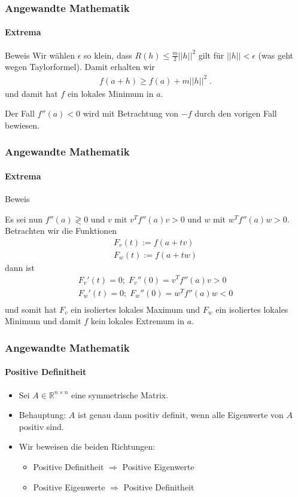 \documentclass{beamer}
\begin{document}
\begin{frame}
    \frametitle{Angewandte Mathematik}
\framesubtitle{Extrema}
    \begin{block}{Beweis}
Wir wählen $\epsilon$ so klein, dass $R(h) \leq \frac{m}{2}  ||h||^2$ gilt für $||h|| < \epsilon$  (was geht wegen Taylorformel).
Damit erhalten wir
\begin{align*}
f(a + h) \geq f(a) +  m ||h||^2 \;.
\end{align*}
und damit hat $f$ ein lokales Minimum in $a$.

Der Fall $f''(a) < 0$ wird mit Betrachtung von $-f$ durch den vorigen Fall bewiesen.
\end{block}
 \end{frame}



\begin{frame}
    \frametitle{Angewandte Mathematik}
\framesubtitle{Extrema}
    \begin{block}{Beweis}


Es sei nun $f''(a) \gtrless 0$ und $v$ mit $v^T f''(a) v > 0$ und $w$ mit $w^T f''(a) w > 0$. Betrachten wir die Funktionen
\begin{align*}
F_v (t) := f(a + tv) \\
F_w(t) := f(a +tw)
\end{align*}
dann ist 
\begin{align*}
F_v' (t) = 0; \; F_v''(0) = v^T f''(a) v > 0 \\
F_w' (t) = 0; \; F_w''(0) = w^T f''(a) w < 0 \\
\end{align*}
und somit hat $F_v$ ein isoliertes lokales Maximum und $F_w$ ein isoliertes lokales Minimum und damit $f$ kein lokales Extremum  in  $a$.
\end{block}
 \end{frame}




 
 \begin{frame}
    \frametitle{Angewandte Mathematik}
    \framesubtitle{Positive Definitheit}
     \begin{itemize}
         \item Sei \( A \in \mathbb{R}^{n \times n} \) eine symmetrische Matrix.
         \item Behauptung: \( A \) ist genau dann positiv definit, wenn alle Eigenwerte von \( A \) positiv sind.
         \item Wir beweisen die beiden Richtungen:
         \begin{itemize}
             \item Positive Definitheit \( \Rightarrow \) Positive Eigenwerte
             \item Positive Eigenwerte \( \Rightarrow \) Positive Definitheit
         \end{itemize}
     \end{itemize}
 \end{frame}
 
\end{document}
